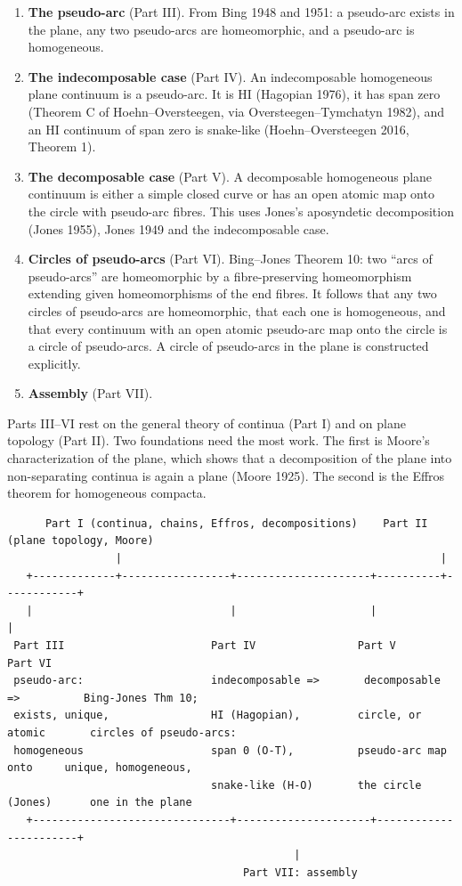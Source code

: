 \documentclass[11pt]{article}
\begin{document}
\begin{enumerate}
  \item[1.] \textbf{The pseudo-arc} (Part III). From Bing 1948 and 1951: a pseudo-arc exists in the plane, any two pseudo-arcs are homeomorphic, and a pseudo-arc is homogeneous.
  \item[2.] \textbf{The indecomposable case} (Part IV). An indecomposable homogeneous plane continuum is a pseudo-arc. It is HI (Hagopian 1976), it has span zero (Theorem C of Hoehn--Oversteegen, via Oversteegen--Tymchatyn 1982), and an HI continuum of span zero is snake-like (Hoehn--Oversteegen 2016, Theorem 1).
  \item[3.] \textbf{The decomposable case} (Part V). A decomposable homogeneous plane continuum is either a simple closed curve or has an open atomic map onto the circle with pseudo-arc fibres. This uses Jones's aposyndetic decomposition (Jones 1955), Jones 1949 and the indecomposable case.
  \item[4.] \textbf{Circles of pseudo-arcs} (Part VI). Bing--Jones Theorem 10: two ``arcs of pseudo-arcs'' are homeomorphic by a fibre-preserving homeomorphism extending given homeomorphisms of the end fibres. It follows that any two circles of pseudo-arcs are homeomorphic, that each one is homogeneous, and that every continuum with an open atomic pseudo-arc map onto the circle is a circle of pseudo-arcs. A circle of pseudo-arcs in the plane is constructed explicitly.
  \item[5.] \textbf{Assembly} (Part VII).
\end{enumerate}

Parts III--VI rest on the general theory of continua (Part I) and on plane topology (Part II). Two foundations need the most work. The first is Moore's characterization of the plane, which shows that a decomposition of the plane into non-separating continua is again a plane (Moore 1925). The second is the Effros theorem for homogeneous compacta.

{\footnotesize
\begin{verbatim}
      Part I (continua, chains, Effros, decompositions)    Part II (plane topology, Moore)
                 |                                                  |
   +-------------+-----------------+---------------------+----------+------------+
   |                               |                     |                       |
 Part III                       Part IV                Part V                  Part VI
 pseudo-arc:                    indecomposable =>       decomposable =>          Bing-Jones Thm 10;
 exists, unique,                HI (Hagopian),         circle, or atomic       circles of pseudo-arcs:
 homogeneous                    span 0 (O-T),          pseudo-arc map onto     unique, homogeneous,
                                snake-like (H-O)       the circle (Jones)      one in the plane
   +-------------------------------+---------------------+-----------------------+
                                             |
                                     Part VII: assembly
\end{verbatim}
}
\end{document}
